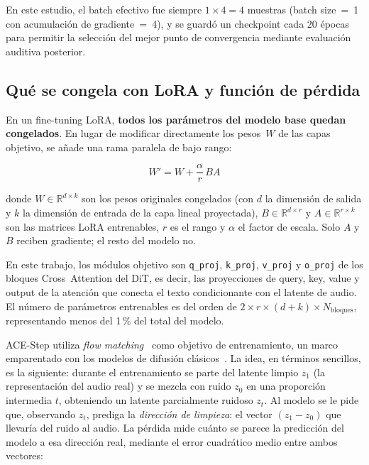 \documentclass[%
    school=etsisi,%
    type=pfg,%
    degree=61CD,%
]{upm-report}
\begin{document}
En este estudio, el batch efectivo fue siempre $1 \times 4 = 4$ muestras (batch size~=~1 con acumulaci\'on de gradiente~=~4), y se guard\'o un checkpoint cada 20 \'epocas para permitir la selecci\'on del mejor punto de convergencia mediante evaluaci\'on auditiva posterior.

\subsection{Qu\'e se congela con LoRA y funci\'on de p\'erdida}
\label{ss:lora-freeze-loss}

En un fine-tuning LoRA, \textbf{todos los par\'ametros del modelo base quedan congelados}. En lugar de modificar directamente los pesos~$W$ de las capas objetivo, se a\~nade una rama paralela de bajo rango:

\begin{equation}
    W' = W + \frac{\alpha}{r}\,BA
    \label{eq:lora}
\end{equation}

donde $W \in \mathbb{R}^{d \times k}$ son los pesos originales congelados (con $d$ la dimensi\'on de salida y $k$ la dimensi\'on de entrada de la capa lineal proyectada), $B \in \mathbb{R}^{d \times r}$ y $A \in \mathbb{R}^{r \times k}$ son las matrices LoRA entrenables, $r$ es el rango y $\alpha$ el factor de escala. Solo $A$ y $B$ reciben gradiente; el resto del modelo no.

En este trabajo, los m\'odulos objetivo son \texttt{q\_proj}, \texttt{k\_proj}, \texttt{v\_proj} y \texttt{o\_proj} de los bloques Cross~Attention del DiT, es decir, las proyecciones de query, key, value y output de la atenci\'on que conecta el texto condicionante con el latente de audio. El n\'umero de par\'ametros entrenables es del orden de $2 \times r \times (d + k) \times N_\text{bloques}$, representando menos del 1\,\% del total del modelo.

ACE-Step utiliza \textit{flow matching}~\cite{lipman2023flow} como objetivo de entrenamiento, un marco emparentado con los modelos de difusi\'on cl\'asicos~\cite{ho2020ddpm}. La idea, en t\'erminos sencillos, es la siguiente: durante el entrenamiento se parte del latente limpio $z_1$ (la representaci\'on del audio real) y se mezcla con ruido $z_0$ en una proporci\'on intermedia $t$, obteniendo un latente parcialmente ruidoso $z_t$. Al modelo se le pide que, observando $z_t$, prediga la \emph{direcci\'on de limpieza}: el vector $(z_1 - z_0)$ que llevar\'ia del ruido al audio. La p\'erdida mide cu\'anto se parece la predicci\'on del modelo a esa direcci\'on real, mediante el error cuadr\'atico medio entre ambos vectores:
\end{document}

